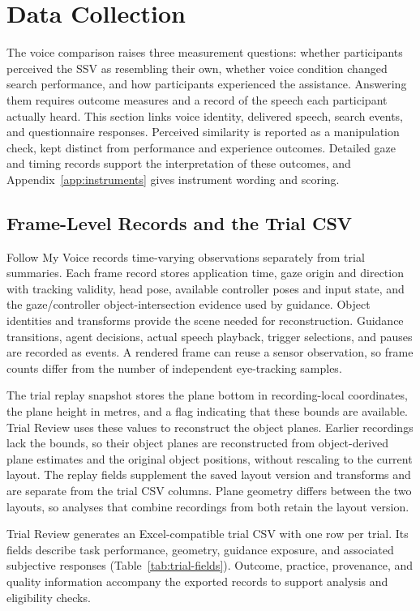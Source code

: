 \section{Data Collection}
\label{ch:measurement}
The voice comparison raises three measurement questions: whether participants perceived the SSV as resembling their own, whether voice condition changed search performance, and how participants experienced the assistance. Answering them requires outcome measures and a record of the speech each participant actually heard. This section links voice identity, delivered speech, search events, and questionnaire responses. Perceived similarity is reported as a manipulation check, kept distinct from performance and experience outcomes. Detailed gaze and timing records support the interpretation of these outcomes, and Appendix~\ref{app:instruments} gives instrument wording and scoring.


\subsection{Frame-Level Records and the Trial CSV}
Follow My Voice records time-varying observations separately from trial summaries. Each frame record stores application time, gaze origin and direction with tracking validity, head pose, available controller poses and input state, and the gaze/controller object-intersection evidence used by guidance. Object identities and transforms provide the scene needed for reconstruction. Guidance transitions, agent decisions, actual speech playback, trigger selections, and pauses are recorded as events. A rendered frame can reuse a sensor observation, so frame counts differ from the number of independent eye-tracking samples.

The trial replay snapshot stores the plane bottom in recording-local coordinates, the plane height in metres, and a flag indicating that these bounds are available. Trial Review uses these values to reconstruct the object planes. Earlier recordings lack the bounds, so their object planes are reconstructed from object-derived plane estimates and the original object positions, without rescaling to the current layout. The replay fields supplement the saved layout version and transforms and are separate from the trial CSV columns. Plane geometry differs between the two layouts, so analyses that combine recordings from both retain the layout version.

Trial Review generates an Excel-compatible trial CSV with one row per trial. Its fields describe task performance, geometry, guidance exposure, and associated subjective responses (Table~\ref{tab:trial-fields}). Outcome, practice, provenance, and quality information accompany the exported records to support analysis and eligibility checks.

